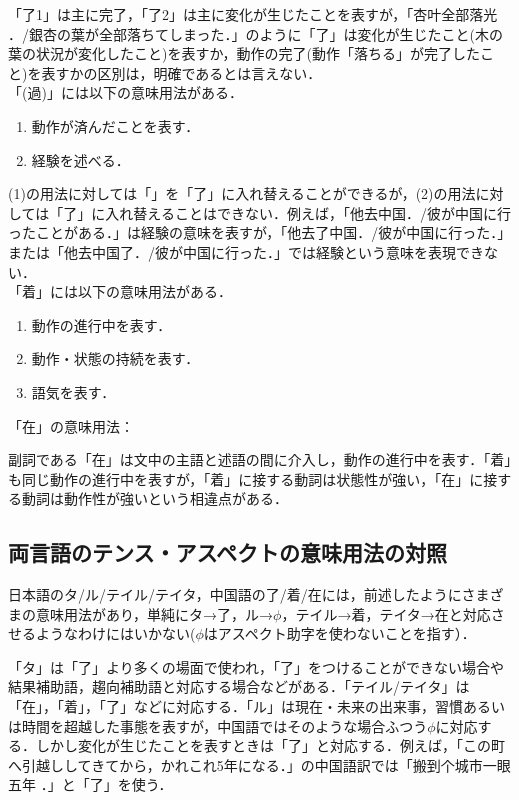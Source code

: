「了1」は主に完了，「了2」は主に変化が生じたことを表すが，「杏叶全部落光 ．/銀杏の葉が全部落ちてしまった．」のように「了」は変化が生じたこと(木の葉の状況が変化したこと)を表すか，動作の完了(動作「落ちる」が完了したこと)を表すかの区別は，明確であるとは言えない．\\

「(過)」には以下の意味用法がある．
\begin{enumerate}
\item 動作が済んだことを表す．
\item 経験を述べる．\\
\end{enumerate}

(1)の用法に対しては「」を「了」に入れ替えることができるが，(2)の用法に対しては「了」に入れ替えることはできない．例えば，「他去中国．/彼が中国に行ったことがある．」は経験の意味を表すが，「他去了中国．/彼が中国に行った．」または「他去中国了．/彼が中国に行った．」では経験という意味を表現できない．\\

「着」には以下の意味用法がある．
\begin{enumerate}
\item 動作の進行中を表す．
\item 動作・状態の持続を表す．
\item 語気を表す．\\
\end{enumerate}

「在」の意味用法：

副詞である「在」は文中の主語と述語の間に介入し，動作の進行中を表す．「着」も同じ動作の進行中を表すが，「着」に接する動詞は状態性が強い，「在」に接する動詞は動作性が強いという相違点がある．

\subsection{両言語のテンス・アスペクトの意味用法の対照}

日本語のタ/ル/テイル/テイタ，中国語の了/着/在には，前述したようにさまざまの意味用法があり，単純にタ→了，ル→$\phi$，テイル→着，テイタ→在と対応させるようなわけにはいかない($\phi$はアスペクト助字を使わないことを指す）．

「タ」は「了」より多くの場面で使われ，「了」をつけることができない場合や結果補助語，趨向補助語と対応する場合などがある\cite{Ryu1987,Cho1985}．「テイル/テイタ」は「在」，「着」，「了」などに対応する\cite{Oh1996}．「ル」は現在・未来の出来事，習慣あるいは時間を超越した事態を表すが，中国語ではそのような場合ふつう$\phi$に対応する．しかし変化が生じたことを表すときは「了」と対応する．例えば，「この町へ引越ししてきてから，かれこれ5年になる．」の中国語訳では「搬到个城市一眼五年 ．」と「了」を使う．

